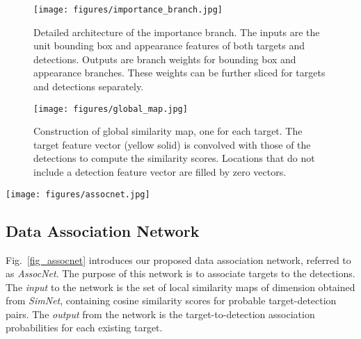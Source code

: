 \documentclass[letterpaper, 10 pt, conference]{ieeeconf}
\begin{document}
\begin{figure}[t]
\vspace{1.5em}
\begin{center}
\texttt{[image: figures/importance\_branch.jpg]}
\end{center}
\caption{Detailed architecture of the importance branch. The inputs are the unit bounding box and appearance features of both targets and detections. Outputs are branch weights for bounding box and appearance branches. These weights can be further sliced for targets and detections separately.}
\label{fig_importance_branch}
\vspace{-1.5em}
\end{figure}
\begin{figure}[t]
\vspace{1.5em}
\begin{center}
\texttt{[image: figures/global\_map.jpg]}
\end{center}
\caption{Construction of global similarity map, one for each target. The target feature vector (yellow solid) is convolved with those of the detections to compute the similarity scores. Locations that do not include a detection feature vector are filled by zero vectors.}
\label{global_map_construction}
\vspace{-1.5em}
\end{figure}




\begin{figure*}[t]
\vspace{1.5em}
\begin{center}
\texttt{[image: figures/assocnet.jpg]}
\end{center}
\caption{The architecture of the proposed association network. The inputs are  local similarity maps from the proposed Siamese network. The outputs are the association maps which provide target-to-detection association and detection probabilities.}
\label{fig_assocnet}
\vspace{-1.5em}
\end{figure*}


\subsection{Data Association Network}
Fig.~\ref{fig_assocnet} introduces our proposed data association network, referred to as \textit{AssocNet}. The purpose of this network is to associate targets to the detections. The \textit{input} to the network is the set of local similarity maps of dimension   obtained from \textit{SimNet}, containing cosine similarity scores for probable target-detection pairs. The \textit{output} from the network is the target-to-detection association probabilities for each existing target.
\end{document}
